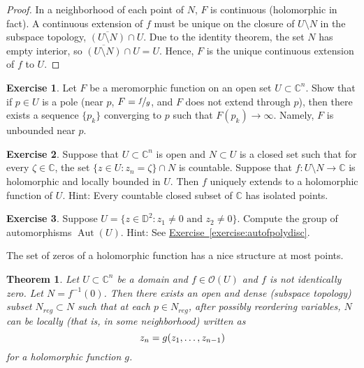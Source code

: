 \documentclass[12pt,openany]{book}
\newcommand{\avoidbreak}{\postdisplaypenalty=100}
\newcommand{\Aut}{\operatorname{Aut}}
\newcommand{\C}{{\mathbb{C}}}
\newcommand{\D}{{\mathbb{D}}}
\newcommand{\sO}{{\mathscr{O}}}
\theoremstyle{plain}
\newtheorem{thm}{Theorem}[section]
\theoremstyle{remark}
\theoremstyle{definition}
\newenvironment{exbox}{%
    \def\FrameCommand{\vrule width 1pt \relax\hspace{10pt}}%
    \MakeFramed{\advance\hsize-\width\FrameRestore}%
}{%
    \endMakeFramed
}
\theoremstyle{exercise}
\newtheorem{exercise}{Exercise}[section]
\theoremstyle{example}
\newcommand{\exerciseref}[1]{\hyperref[#1]{Exercise~\ref*{#1}}}
\begin{document}
\begin{proof}
In a neighborhood of each point of $N$,
$F$ is continuous
(holomorphic in fact).
A continuous extension of $f$ must be unique
on the closure of
$U \setminus N$ in the subspace topology,
$\overline{(U \setminus N)} \cap U$.
Due to the identity theorem, the set $N$ has empty interior,
so $\overline{(U \setminus N)} \cap U = U$.  Hence, $F$ is the unique
continuous extension of $f$ to $U$.
\end{proof}

\begin{exbox}
\begin{exercise}
Let $F$ be a meromorphic function on an open set $U \subset \C^n$.  Show
that if $p \in U$ is a pole (near $p$, $F=\nicefrac{f}{g}$, and $F$ does not
extend through $p$), then there exists a sequence $\{ p_k \}$
converging to $p$ such that $F(p_k) \to \infty$.  Namely, $F$ is
unbounded near $p$.
\end{exercise}

\begin{exercise}
Suppose that $U \subset \C^n$ is open and $N \subset U$ is a closed set
such that for every $\zeta \in \C$, the set
$\{ z \in U : z_n = \zeta \} \cap N$ is countable.
Suppose that $f \colon U \setminus N \to \C$ is holomorphic and
locally bounded in $U$.  Then $f$ uniquely extends to a holomorphic function
of $U$.  Hint: Every countable closed subset of $\C$ has isolated points.
\end{exercise}

\begin{exercise}
Suppose $U = \{ z \in \D^2 : z_1 \not=0 \text{ and } z_2 \not= 0 \}$.
Compute the group of automorphisms $\Aut(U)$.
Hint: See \exerciseref{exercise:autofpolydisc}.
\end{exercise}
\end{exbox}

The set of zeros of a holomorphic function has a nice structure at most
points.

\begin{thm} \label{thm:regptsdense}
Let $U \subset \C^n$ be a domain and
$f \in \sO(U)$ and $f$ is not identically zero.
Let $N = f^{-1}(0)$.
Then there exists an open and dense
(subspace topology) subset
$N_{\mathit{reg}} \subset N$
such that at each $p \in N_{\mathit{reg}}$, after possibly reordering variables,
$N$ can be locally (that is, in some neighborhood) written as
\begin{equation*}
z_n = g(z_1,\ldots,z_{n-1})
\avoidbreak
\end{equation*}
for a holomorphic function $g$.
\end{thm}
\end{document}
